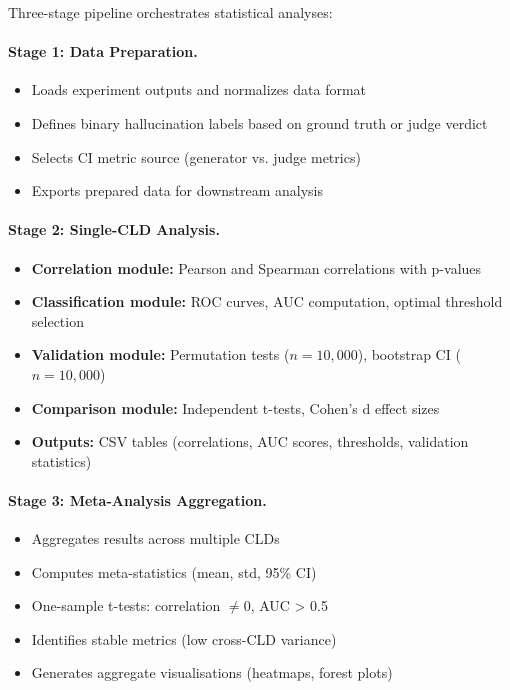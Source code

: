 Three-stage pipeline orchestrates statistical analyses:

\paragraph{Stage 1: Data Preparation.}
\begin{itemize}
    \item Loads experiment outputs and normalizes data format
    \item Defines binary hallucination labels based on ground truth or judge verdict
    \item Selects CI metric source (generator vs. judge metrics)
    \item Exports prepared data for downstream analysis
\end{itemize}

\paragraph{Stage 2: Single-CLD Analysis.}
\begin{itemize}
    \item \textbf{Correlation module:} Pearson and Spearman correlations with p-values
    \item \textbf{Classification module:} ROC curves, AUC computation, optimal threshold selection
    \item \textbf{Validation module:} Permutation tests (\(n=10{,}000\)), bootstrap CI (\(n=10{,}000\))
    \item \textbf{Comparison module:} Independent t-tests, Cohen's d effect sizes
    \item \textbf{Outputs:} CSV tables (correlations, AUC scores, thresholds, validation statistics)
\end{itemize}

\paragraph{Stage 3: Meta-Analysis Aggregation.}
\begin{itemize}
    \item Aggregates results across multiple CLDs
    \item Computes meta-statistics (mean, std, 95\% CI)
    \item One-sample t-tests: correlation \(\neq 0\), AUC > 0.5
    \item Identifies stable metrics (low cross-CLD variance)
    \item Generates aggregate visualisations (heatmaps, forest plots)
\end{itemize}

